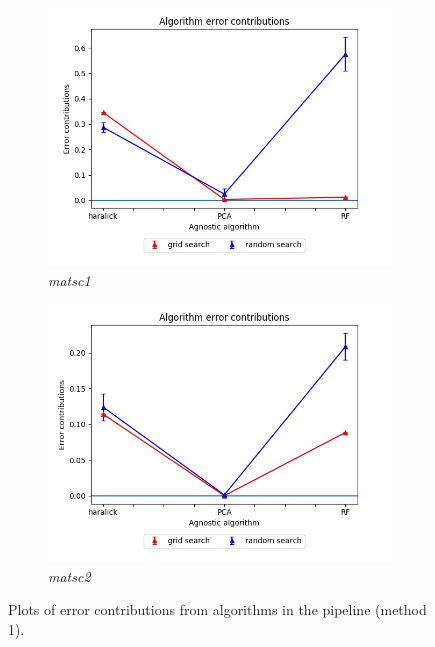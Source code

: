 \begin{figure}[H]
\begin{subfigure}{.5\textwidth}
  \centering
  \includegraphics[scale=0.37]{img/EP/agnostic_error_alg_matsc_dataset1}
  \caption{\textit{matsc1}}
  \label{fig:sfig3}
\end{subfigure}%
\begin{subfigure}{.5\textwidth}
  \centering
  \includegraphics[scale=0.37]{img/EP/agnostic_error_alg_matsc_dataset2}
  \caption{\textit{matsc2}}
  \label{fig:sfig4}
\end{subfigure}

\caption{Plots of error contributions from algorithms in the pipeline (method 1).}
\label{fig:fig}
\end{figure}


